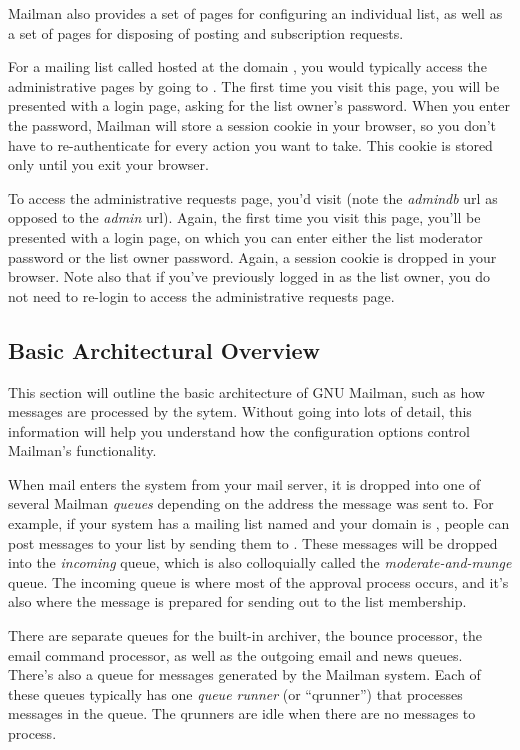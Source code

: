 \documentclass{howto}
\begin{document}
Mailman also provides a set of pages for configuring an individual
list, as well as a set of pages for disposing of posting and
subscription requests.

For a mailing list called  hosted at the domain
, you would typically access the administrative
pages by going to .
The first time you visit this page, you will be presented with a login
page, asking for the list owner's password.  When you enter the
password, Mailman will store a session cookie in your browser, so you
don't have to re-authenticate for every action you want to take.  This
cookie is stored only until you exit your browser.

To access the administrative requests page, you'd visit
 (note the
\emph{admindb} url as opposed to the \emph{admin} url).  Again, the
first time you visit this page, you'll be presented with a login page,
on which you can enter either the list moderator password or the list
owner password.  Again, a session cookie is dropped in your browser.
Note also that if you've previously logged in as the list owner, you
do not need to re-login to access the administrative requests page.

\subsection{Basic Architectural Overview}

This section will outline the basic architecture of GNU Mailman, such
as how messages are processed by the sytem.  Without going into lots
of detail, this information will help you understand how the
configuration options control Mailman's functionality.

When mail enters the system from your mail server, it is dropped into
one of several Mailman \emph{queues} depending on the address the
message was sent to.  For example, if your system has a mailing list
named  and your domain is , people can
post messages to your list by sending them to
.  These messages will be dropped into the
\emph{incoming} queue, which is also colloquially called the
\emph{moderate-and-munge} queue.  The incoming queue is where most of
the approval process occurs, and it's also where the message is
prepared for sending out to the list membership.

There are separate queues for the built-in archiver, the bounce
processor, the email command processor, as well as the outgoing email
and news queues.  There's also a queue for messages generated by the
Mailman system.  Each of these queues typically has one \emph{queue
runner} (or ``qrunner'') that processes messages in the queue.  The
qrunners are idle when there are no messages to process.
\end{document}
